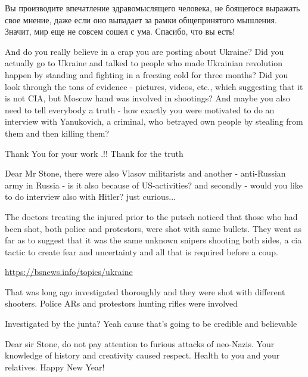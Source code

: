 \begin{itemize}

Вы производите впечатление здравомыслящего человека, не боящегося выражать свое
мнение, даже если оно выпадает за рамки общепринятого мышления. Значит, мир еще
не совсем сошел с ума. Спасибо, что вы есть!



And do you really believe in a crap you are posting about Ukraine? Did you
actually go to Ukraine and talked to people who made Ukrainian revolution
happen by standing and fighting in a freezing cold for three months? Did you
look through the tons of evidence - pictures, videos, etc., which suggesting
that it is not CIA, but Moscow hand was involved in shootings? And maybe you
also need to tell everybody a truth - how exactly you were motivated to do an
interview with Yanukovich, a criminal, who betrayed own people by stealing from
them and then killing them?

Thank You for your work .!! Thank for the truth


Dear Mr Stone, there were also Vlasov militarists and another - anti-Russian
army in Russia - is it also because of US-activities? and secondly - would you
like to do interview also with Hitler? just curious...


The doctors treating the injured prior to the putsch noticed that those who had
been shot, both police and protestors, were shot with same bullets. They went
as far as to suggest that it was the same unknown snipers shooting both sides,
a cia tactic to create fear and uncertainty and all that is required before a
coup.

\url{https://bsnews.info/topics/ukraine}

\begin{itemize} %
That was long ago investigated thoroughly and they were shot with different shooters. Police ARs and protestors hunting rifles were involved

Investigated by the junta? Yeah cause that's going to be credible and believable
\end{itemize} %

Dear sir Stone, do not pay attention to furious attacks of neo-Nazis. Your knowledge of history and creativity caused respect. Health to you and your relatives. Happy New Year!


\end{itemize}
